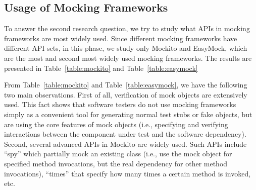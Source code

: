 \vspace{-0.2cm}
\subsection{Usage of Mocking Frameworks}
\label{subsec:usage}
\vspace{-0.2cm}

To answer the second research question, we try to study what APIs in mocking frameworks are most widely used. Since different mocking frameworks have different API sets, in this phase, we study only Mockito and EasyMock, which are the most and second most widely used mocking frameworks. The results are presented in Table~\ref{table:mockito} and Table~\ref{table:easymock}

From Table~\ref{table:mockito} and Table~\ref{table:easymock}, we have the following two main observations. First of all, verification of mock objects are extensively used. This fact shows that software testers do not use mocking frameworks simply as a convenient tool for generating normal test stubs or fake objects, but are using the core features of mock objects (i.e., specifying and verifying interactions between the component under test and the software dependency). Second, several advanced APIs in Mockito are widely used. Such APIs include ``spy'' which partially mock an existing class (i.e., use the mock object for specified method invocations, but the real dependency for other method invocations), ``times'' that specify how many times a certain method is invoked, etc. 



